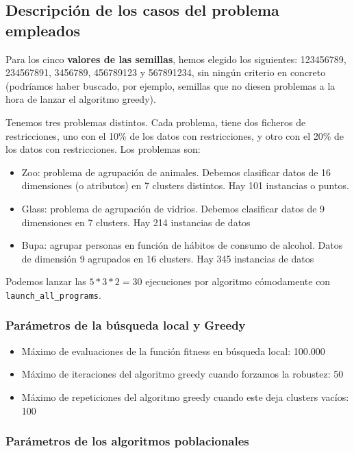 \documentclass[11pt]{article}
\begin{document}
\subsection{Descripción de los casos del problema empleados}

Para los cinco \textbf{valores de las semillas}, hemos elegido los siguientes: 123456789, 234567891, 3456789, 456789123 y 567891234, sin ningún criterio en concreto (podríamos haber buscado, por ejemplo, semillas que no diesen problemas a la hora de lanzar el algoritmo greedy).

Tenemos tres problemas distintos. Cada problema, tiene dos ficheros de restricciones, uno con el 10\% de los datos con restricciones, y otro con el 20\% de los datos con restricciones. Los problemas son:

\begin{itemize}
    \item Zoo: problema de agrupación de animales. Debemos clasificar datos de 16 dimensiones (o atributos) en 7 clusters distintos. Hay 101 instancias o puntos.
    \item Glass: problema de agrupación de vidrios. Debemos clasificar datos de 9 dimensiones en 7 clusters. Hay 214 instancias de datos
    \item Bupa: agrupar personas en función de hábitos de consumo de alcohol. Datos de dimensión 9 agrupados en 16 clusters. Hay 345 instancias de datos
\end{itemize}

Podemos lanzar las $5 * 3 * 2 = 30$ ejecuciones por algoritmo cómodamente con \lstinline{launch_all_programs}.

\subsubsection{Parámetros de la búsqueda local y Greedy}

\begin{itemize}
\item Máximo de evaluaciones de la función fitness en búsqueda local: 100.000
    \item Máximo de iteraciones del algoritmo greedy cuando forzamos la robustez: 50
    \item Máximo de repeticiones del algoritmo greedy cuando este deja clusters vacíos: 100
\end{itemize}

\subsubsection{Parámetros de los algoritmos poblacionales} \label{section:parametros_poblacionales}
\end{document}
